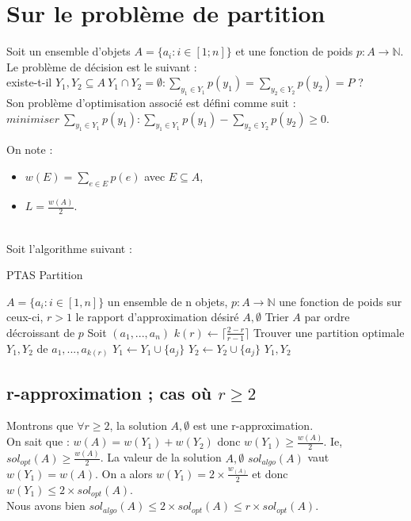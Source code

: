 
\section{Sur le problème de partition}\label{ex5}

Soit un ensemble d'objets $A = \{a_i : i \in [1;n]\}$ et une fonction de poids $p : A
\rightarrow \mathbb{N}$.\\
Le problème de décision est le suivant : \\
existe-t-il $Y_1,Y_2 \subseteq A\ Y_1 \cap Y_2 = \emptyset: \sum_{y_{1} \in Y_1}p(y_1) = \sum_{y_2 
\in Y_2}p(y_2) = P$ ?\\
Son problème d'optimisation associé est défini comme suit :\\
$minimiser\ \sum_{y_1 \in Y_1}p(y_1) : \sum_{y_1 \in Y_1}p(y_1) - \sum_{y_2 \in Y_2}p(y_2) 
\geq 0$.

On note :
\begin{itemize}
	\item $w(E) = \sum_{e \in E}p(e)$ avec $E \subseteq A$,
	\item $L = \frac{w(A)}{2}$.
\end{itemize}
~\\
Soit l'algorithme suivant :

\begin{center}
\begin{algorithm}[H]
\caption{PTAS Partition}\label{ex5_algo}
\begin{algorithmic}[1]
\REQUIRE $A = \{a_i : i \in [1,n]\}$ un ensemble de n objets,
		 $p : A \rightarrow \mathbb{N}$ une fonction de poids sur ceux-ci,
		 $r > 1$ le rapport d'approximation désiré
		\RETURN $A,\emptyset$
	\ENDIF
	\STATE Trier $A$ par ordre décroissant de $p$
	\STATE Soit $(a_1,...,a_n)$
	\STATE $k(r) \leftarrow \lceil\frac{2-r}{r-1}\rceil$
	\STATE Trouver une partition optimale $Y_1,Y_2$ de $a_1,...,a_{k(r)}$
			\STATE $Y_1 \leftarrow Y_1 \cup \{a_j\}$
		\ELSE
			\STATE $Y_2 \leftarrow Y_2 \cup \{a_j\}$
		\ENDIF
	\ENDFOR
	\RETURN $Y_1,Y_2$
\end{algorithmic}
\end{algorithm}
\end{center}

\subsection{r-approximation ; cas où $r \geq 2$}\label{ex5_q1}
Montrons que $\forall r \geq 2$, la solution $A,\emptyset$ est une r-approximation.\\
On sait que : $w(A) = w(Y_1) + w(Y_2)$ donc $w(Y_1) \geq \frac{w(A)}{2}$. Ie,
$sol_{opt}(A) \geq \frac{w(A)}{2}$.
La valeur de la solution $A,\emptyset$ $sol_{algo}(A)$ vaut $w(Y_1) = w(A)$.
On a alors $w(Y_1) = 2 \times \frac{w_(A)}{2}$ et donc $w(Y_1) \leq 2 \times
sol_{opt}(A)$.\\
Nous avons bien $sol_{algo}(A) \leq 2 \times sol_{opt}(A) \leq r \times sol_{opt}(A)$.

